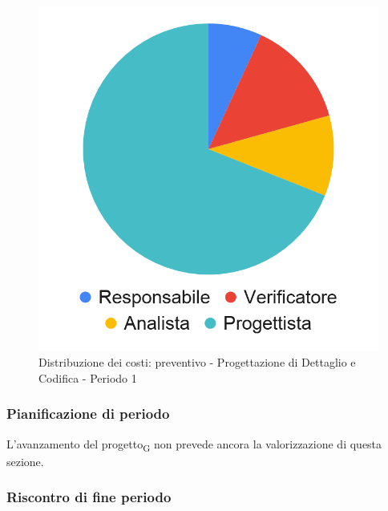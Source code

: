 \hspace{-1cm}
\begin{minipage}{.50\textwidth}
\smallPreventivoTable{
	
}
\end{minipage}
\hspace{1cm}
\begin{minipage}{.40\textwidth}
\begin{figure}[H]
	\includegraphics[scale=0.21]{res/images/charts/preventivo_priori/Grafico4-6.png}
	\caption{Distribuzione dei costi: preventivo - Progettazione di Dettaglio e Codifica - Periodo 1}
\end{figure}
\end{minipage} 



\subsubsection{Pianificazione di periodo}

L'avanzamento del progetto\textsubscript{G} non prevede ancora la valorizzazione di questa sezione.


\subsubsection{Riscontro di fine periodo}


